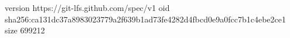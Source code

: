 version https://git-lfs.github.com/spec/v1
oid sha256:ca131dc37a8983023779a2f639b1ad73fe4282d4fbcd0e9a0fcc7b1c4ebe2ce1
size 699212

